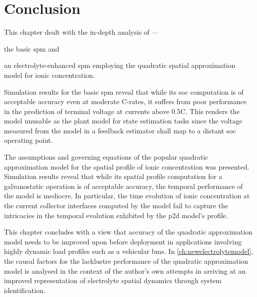 \section{Conclusion}

This chapter dealt with the in-depth analysis of ---
\begin{enumerate*}[label=\itshape\alph*\upshape)]
    \item the basic \gls{spm} and
    \item an electrolyte-enhanced \gls{spm} employing the quadratic spatial approximation model for ionic concentration.
\end{enumerate*}
Simulation results for  the basic \gls{spm}  reveal that   while its  \gls{soc}
computation is of acceptable accuracy even at moderate C-rates, it suffers from
poor performance in the prediction of terminal voltage at currents above  0.5C.
This renders the model unusable as the  plant model  for  state estimation tasks
since the  voltage measured from the  model  in a  feedback estimator shall  map
to a   distant \gls{soc} operating point.


The  assumptions  and governing equations of the popular quadratic approximation
model for the spatial profile of  ionic concentration was presented. Simulation
results reveal that while its spatial  profile computation for a galvanostatic
operation is of  acceptable accuracy, the temporal  performance of the model  is
mediocre. In particular, the time evolution of ionic concentration at the
current collector interfaces computed by the model fail to capture the
intricacies in the temporal evolution exhibited by  the \gls{p2d} model's
profile.

This chapter concludes with a view that accuracy of the quadratic approximation
model needs to be improved upon before deployment in applications involving
highly dynamic load profiles such as a vehicular \gls{bms}. In
\cref{ch:newelectrolytemodel}, the causal factors for the  lacklustre
performance of the quadratic approximation model is analysed in the context of
the author's  own attempts  in arriving  at an improved representation of
electrolyte spatial dynamics through system identification.

